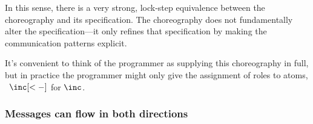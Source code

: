 \begin{description}[font=\normalfont\itshape, leftmargin=\parindent, labelindent=\leftmargin, listparindent=\parindent, parsep=0pt]
In this sense, there is a very strong, lock-step equivalence between the choreography and its specification.
The choreography does not fundamentally alter the specification---it only refines that specification by making the communication patterns explicit.
\end{description}
%
%
%
It's convenient to think of the programmer as supplying this choreography in full, but in practice the programmer might only give the assignment of roles to atoms, \eg\ $\inc[<-]$ for $\inc$.

\subsubsection{Messages can flow in both directions}\label{sec:chor-binary-count}

